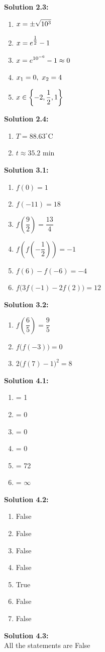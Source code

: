 \documentclass{article}
\newcommand{\solution}[2][]{%
  \par\noindent\textbf{Solution #1:\\} #2\par \vspace*{.25cm}
}
\begin{document}
\solution[2.3]{
  \begin{enumerate}[label=\alph*.]
    \item $\displaystyle x = \pm \sqrt{10^3}$
    \item $\displaystyle x = e^{\tfrac{1}{2}}-1$
    \item $\displaystyle x = e^{10^{-6}}-1 \approx 0$
    \item $\displaystyle x_1 = 0,\ x_2 = 4$
    \item $\displaystyle x \in \left\{-2, \dfrac{1}{2}, 1\right\}$
  \end{enumerate}
}

\newpage
\solution[2.4]{
  \begin{enumerate}[label=\alph*.]
    \item $T = 88.63^\circ$C
    \item $t \approx 35.2$ min
  \end{enumerate}
}

\solution[3.1]{
  \begin{enumerate}[label=\alph*.]
    \item $f(0) = 1$
    \item $f(-11)=18$
    \item $f\left(\dfrac{9}{2}\right) = \dfrac{13}{4}$
    \item $f\left(f\left(-\dfrac{1}{2}\right)\right) = -1$
    \item $f(6) - f(-6) = -4$
    \item $f\big(3f(-1)-2f(2)\big) = 12$
  \end{enumerate}
}

\solution[3.2]{
  \begin{enumerate}[label=\alph*.]
    \item $f\left(\dfrac{6}{5}\right) = \dfrac{9}{5}$
    \item $f\big(f(-3)\big) = 0$
    \item $2\big(f(7)-1\big)^2=8$
  \end{enumerate}
}

\solution[4.1]{
  \begin{enumerate}[label=\alph*.]
    \item = 1
    \item = 0
    \item = 0
    \item = 0
    \item = 72
    \item = $\infty$
  \end{enumerate}
}

\solution[4.2]{
  \begin{enumerate}[label=\alph*.]
    \item False
    \item False
    \item False
    \item False
    \item True
    \item False
    \item False
  \end{enumerate}
}

\solution[4.3]{
  All the statements are False
}
\end{document}
